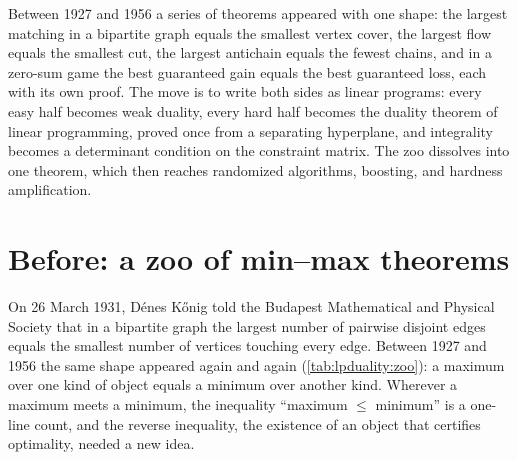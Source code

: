 \begin{refsection}

\newcommand{\lpone}{\mathbf{1}}
\newcommand{\lpcone}{\operatorname{cone}}
\newcommand{\lpval}{\operatorname{val}}
\newcommand{\lpcost}{\operatorname{cost}}
\newcommand{\lperr}{\operatorname{err}}
\newcommand{\lpQ}{\mathcal{Q}}

\begin{chaptersummary}
Between 1927 and 1956 a series of theorems appeared with one shape: the largest matching in a bipartite graph equals the smallest vertex cover, the largest flow equals the smallest cut, the largest antichain equals the fewest chains, and in a zero-sum game the best guaranteed gain equals the best guaranteed loss, each with its own proof. The move is to write both sides as linear programs: every easy half becomes weak duality, every hard half becomes the duality theorem of linear programming, proved once from a separating hyperplane, and integrality becomes a determinant condition on the constraint matrix. The zoo dissolves into one theorem, which then reaches randomized algorithms, boosting, and hardness amplification.
\end{chaptersummary}

\section{Before: a zoo of min--max theorems}\label{sec:lpduality:before}

On 26 March 1931, D\'enes K\H{o}nig told the Budapest Mathematical and Physical Society that in a bipartite graph the largest number of pairwise disjoint edges equals the smallest number of vertices touching every edge. Between 1927 and 1956 the same shape appeared again and again (\cref{tab:lpduality:zoo}): a maximum over one kind of object equals a minimum over another kind. Wherever a maximum meets a minimum, the inequality ``maximum $\le$ minimum'' is a one-line count, and the reverse inequality, the existence of an object that certifies optimality, needed a new idea.


\end{refsection}

